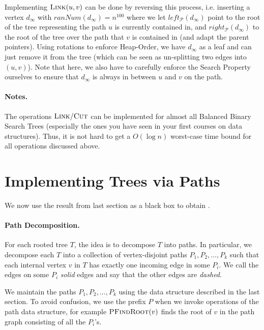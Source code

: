 Implementing $\textsc{Link}(u,v)$ can be done by reversing this process, i.e. inserting a vertex $d_{\infty}$ with $ranNum(d_{\infty}) = n^{100}$ where we let $left_{\mathcal{P}}(d_{\infty})$ point to the root of the tree representing the path $u$ is currently contained in,  and  $right_{\mathcal{P}}(d_{\infty}) $ to the root of the tree over the path that $v$ is contained in (and adapt the parent pointers). Using rotations to enforce Heap-Order, we have $d_{\infty}$ as a leaf and can just remove it from the tree (which can be seen as un-splitting two edges into $(u,v)$).  Note that here,  we also have to carefully enforce the Search Property ourselves to ensure that $d_{\infty}$ is always in between $u$ and $v$ on the path.

\paragraph{Notes.} The operations $\textsc{Link}/ \textsc{Cut}$ can be implemented for almost all Balanced Binary Search Trees (especially the ones you have seen in your first courses on data structures). Thus, it is not hard to get a $O(\log n)$ worst-case time bound for all operations discussed above.

\section{Implementing Trees via Paths}

We now use the result from last section as a black box to obtain .

\paragraph{Path Decomposition.} For each rooted tree $T$, the idea is to decompose $T$ into paths. In particular, we decompose each $T$ into a collection of vertex-disjoint paths $P_1, P_2, \dots, P_k$ such that each internal vertex $v$ in $T$ has exactly one incoming edge in some $P_i$. We call the edges on some $P_i$  \emph{solid} edges and say that the other edges are \emph{dashed}. 

We maintain the paths $P_1, P_2, \dots, P_k$ using the data structure described in the last section. To avoid confusion, we use the prefix $P$ when we invoke operations of the path data structure, for example $\textsc{PFindRoot}(v)$ finds the root of $v$ in the path graph consisting of all the $P_i$'s.

